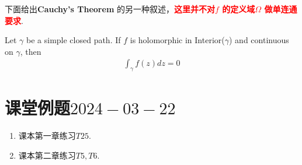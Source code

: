 \newpage
下面给出\textbf{Cauchy's Theorem} 的另一种叙述，\textcolor{red}{\textbf{这里并不对$f$ 的定义域$\Omega$ 做单连通要求}}.
\begin{thm}\label{thm 4.3.3}
	Let $\gamma$ be a simple closed path. If $f$ is holomorphic in Interior($\gamma$) and continuous on $\gamma$, then
	\begin{align}
		\int_{\gamma}{f(z) dz} = 0
	\end{align}
\end{thm}

\newpage
\section{课堂例题$2024-03-22$}
\begin{enumerate}
	\item 课本第一章练习$T25$.
	
	\vspace{2em}
	
	\item 课本第二章练习$T5 , T6$.
\end{enumerate}






	\ifx\allfiles\undefined

\fi